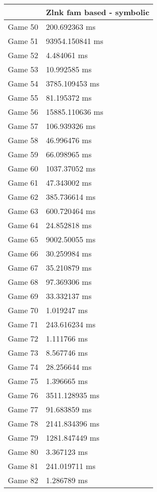 \begin{tabular}{|l|l|}
	\hline
	& Zlnk fam based - symbolic \\ \hline
	Game 50 & 200.692363 ms \\ \hline
	Game 51 & 93954.150841 ms \\ \hline
	Game 52 & 4.484061 ms \\ \hline
	Game 53 & 10.992585 ms \\ \hline
	Game 54 & 3785.109453 ms \\ \hline
	Game 55 & 81.195372 ms \\ \hline
	Game 56 & 15885.110636 ms \\ \hline
	Game 57 & 106.939326 ms \\ \hline
	Game 58 & 46.996476 ms \\ \hline
	Game 59 & 66.098965 ms \\ \hline
	Game 60 & 1037.37052 ms \\ \hline
	Game 61 & 47.343002 ms \\ \hline
	Game 62 & 385.736614 ms \\ \hline
	Game 63 & 600.720464 ms \\ \hline
	Game 64 & 24.852818 ms \\ \hline
	Game 65 & 9002.50055 ms \\ \hline
	Game 66 & 30.259984 ms \\ \hline
	Game 67 & 35.210879 ms \\ \hline
	Game 68 & 97.369306 ms \\ \hline
	Game 69 & 33.332137 ms \\ \hline
	Game 70 & 1.019247 ms \\ \hline
	Game 71 & 243.616234 ms \\ \hline
	Game 72 & 1.111766 ms \\ \hline
	Game 73 & 8.567746 ms \\ \hline
	Game 74 & 28.256644 ms \\ \hline
	Game 75 & 1.396665 ms \\ \hline
	Game 76 & 3511.128935 ms \\ \hline
	Game 77 & 91.683859 ms \\ \hline
	Game 78 & 2141.834396 ms \\ \hline
	Game 79 & 1281.847449 ms \\ \hline
	Game 80 & 3.367123 ms \\ \hline
	Game 81 & 241.019711 ms \\ \hline
	Game 82 & 1.286789 ms \\ \hline

\end{tabular}
